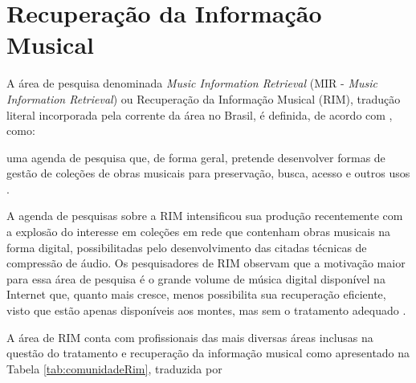 \section{Recuperação da Informação Musical}

A área de pesquisa denominada \textit{Music Information Retrieval} (MIR - \textit{Music Information Retrieval}) ou Recuperação da Informação Musical (RIM), tradução literal incorporada pela corrente da área no Brasil, é definida, de acordo com , como:

\begin{citacao}
[...] uma agenda de pesquisa que, de forma geral, pretende desenvolver formas de gestão de coleções de obras musicais para preservação, busca, acesso e outros usos \cite{futrelle&downie2002}.
\end{citacao}

A agenda de pesquisas sobre a RIM intensificou sua produção recentemente com a explosão do interesse em coleções em rede que contenham obras musicais na forma digital, possibilitadas pelo desenvolvimento das citadas técnicas de compressão de áudio. Os pesquisadores de RIM observam que a motivação maior para essa área de pesquisa é o grande volume de música digital disponível na Internet que, quanto mais cresce, menos possibilita sua recuperação eficiente, visto que estão apenas disponíveis aos montes, mas sem o tratamento adequado \cite{gomes2015}.

A área de RIM conta com profissionais das mais diversas áreas inclusas na questão do tratamento e recuperação da informação musical como apresentado na Tabela \ref{tab:comunidadeRim}, traduzida por 

